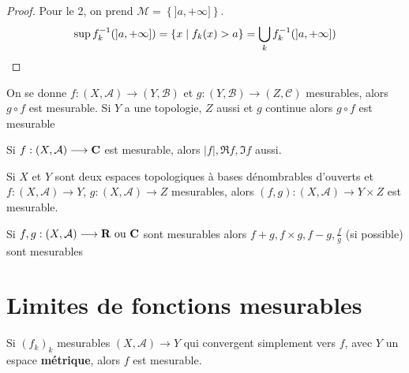 \begin{proof}
    Pour le 2, on prend $\mathcal  M = \left\{ ]a, +\infty] \right\} $. \[
        \sup f_k^{-1}(]a, +\infty])= \left\{  x \suchthat f_k(x)>a \right\} = \bigcup_k f_k^{-1}(]a, +\infty])
    \] 
\end{proof}

\begin{prop}
    On se donne $f:(X, \mathcal  A) \longrightarrow (Y, \mathcal B)$ et $g:(Y, \mathcal  B)\longrightarrow (Z, \mathcal  C)$ mesurables, alors $g\circ f$ est mesurable.
    Si  $Y$ a une topologie, $Z$ aussi et $g$ continue alors  $g\circ f $ est mesurable
\end{prop}

\begin{cor}
    Si $f:(X, \mathcal  A)\longrightarrow \mathbf C$ est mesurable, alors $|f|, \Re f, \Im f$ aussi.
\end{cor}

\begin{prop}
    Si $X$ et  $Y$ sont deux espaces topologiques à bases dénombrables d'ouverts et  $f:(X, \mathcal  A)\longrightarrow Y$, $g:(X, \mathcal  A)\longrightarrow Z$ mesurables, alors $(f, g):(X, \mathcal  A)\longrightarrow Y\times Z$ est mesurable.
\end{prop}

\begin{cor}
    Si $f,g:(X, \mathcal  A)\longrightarrow \mathbf R\text{ ou }\mathbf C$ sont mesurables alors $f+g, f\times g, f-g, \frac{f}{g}$ (si possible) sont mesurables
\end{cor}

\section{Limites de fonctions mesurables}

\begin{thm}
    Si $(f_k)_k$ mesurables $(X, \mathcal A)\longrightarrow Y$ qui convergent simplement vers $f$, avec $Y$ un espace \textbf{métrique}, alors  $f$ est mesurable.
\end{thm}
